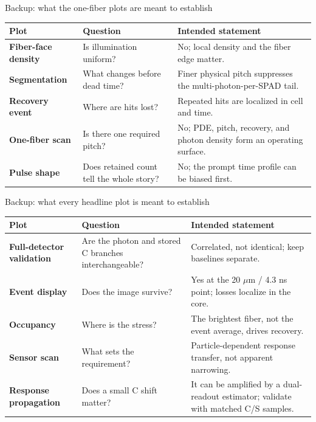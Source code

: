 \documentclass[10pt,aspectratio=169,t]{beamer}
\begin{document}
\begin{frame}{Backup: what the one-fiber plots are meant to establish}
  \fontsize{8.0}{9.6}\selectfont
  \begin{tabularx}{\textwidth}{>{\bfseries}p{3.1cm} X X}
    \toprule
    Plot & Question & Intended statement \\
    \midrule
    Fiber-face density & Is illumination uniform? & No; local density and the fiber edge matter. \\
    Segmentation & What changes before dead time? & Finer physical pitch suppresses the multi-photon-per-SPAD tail. \\
    Recovery event & Where are hits lost? & Repeated hits are localized in cell and time. \\
    One-fiber scan & Is there one required pitch? & No; PDE, pitch, recovery, and photon density form an operating surface. \\
    Pulse shape & Does retained count tell the whole story? & No; the prompt time profile can be biased first. \\
    \bottomrule
  \end{tabularx}
\end{frame}

\begin{frame}{Backup: what every headline plot is meant to establish}
  \fontsize{8.0}{9.6}\selectfont
  \begin{tabularx}{\textwidth}{>{\bfseries}p{3.2cm} X X}
    \toprule
    Plot & Question & Intended statement \\
    \midrule
    Full-detector validation & Are the photon and stored C branches interchangeable? & Correlated, not identical; keep baselines separate. \\
    Event display & Does the image survive? & Yes at the 20 $\mu$m / 4.3 ns point; losses localize in the core. \\
    Occupancy & Where is the stress? & The brightest fiber, not the event average, drives recovery. \\
    Sensor scan & What sets the requirement? & Particle-dependent response transfer, not apparent narrowing. \\
    Response propagation & Does a small C shift matter? & It can be amplified by a dual-readout estimator; validate with matched C/S samples. \\
    \bottomrule
  \end{tabularx}
\end{frame}
\end{document}
